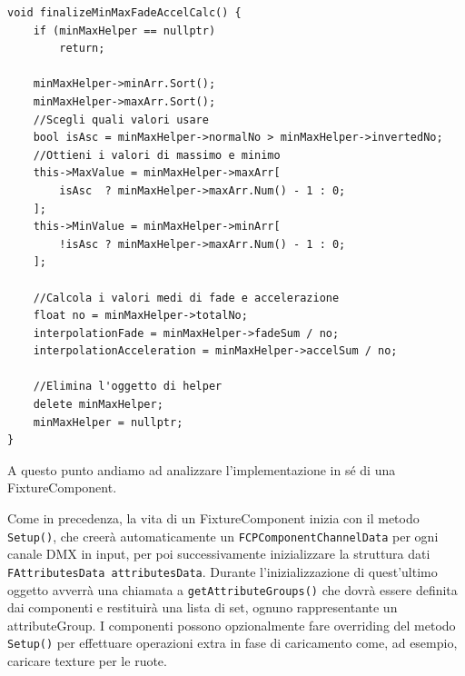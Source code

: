 \documentclass[main.tex]{subfiles}
\begin{document}
\begin{lstlisting}
void finalizeMinMaxFadeAccelCalc() {
    if (minMaxHelper == nullptr)
        return;
    
    minMaxHelper->minArr.Sort();
    minMaxHelper->maxArr.Sort();
    //Scegli quali valori usare
    bool isAsc = minMaxHelper->normalNo > minMaxHelper->invertedNo;
    //Ottieni i valori di massimo e minimo
    this->MaxValue = minMaxHelper->maxArr[
        isAsc  ? minMaxHelper->maxArr.Num() - 1 : 0;
    ];
    this->MinValue = minMaxHelper->minArr[
        !isAsc ? minMaxHelper->maxArr.Num() - 1 : 0;
    ];

    //Calcola i valori medi di fade e accelerazione
    float no = minMaxHelper->totalNo;
    interpolationFade = minMaxHelper->fadeSum / no;
    interpolationAcceleration = minMaxHelper->accelSum / no;

    //Elimina l'oggetto di helper
    delete minMaxHelper;
    minMaxHelper = nullptr;
}
\end{lstlisting}

A questo punto andiamo ad analizzare l'implementazione in sé di una FixtureComponent.\newline

Come in precedenza, la vita di un FixtureComponent inizia con il metodo \lstinline{Setup()}, che creerà automaticamente un \lstinline{FCPComponentChannelData} per ogni canale DMX in input, per poi successivamente inizializzare la struttura dati \lstinline{FAttributesData attributesData}. Durante l'inizializzazione di quest'ultimo oggetto avverrà una chiamata a \lstinline{getAttributeGroups()} che dovrà essere definita dai componenti e restituirà una lista di set, ognuno rappresentante un attributeGroup. I componenti possono opzionalmente fare overriding del metodo \lstinline{Setup()} per effettuare operazioni extra in fase di caricamento come, ad esempio, caricare texture per le ruote.
\end{document}
